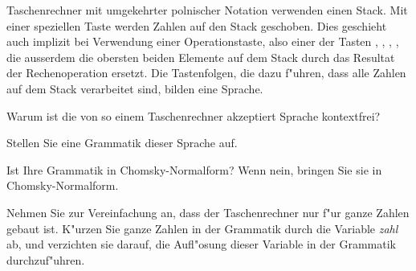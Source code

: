 Taschenrechner mit umgekehrter polnischer Notation verwenden einen Stack.
Mit einer speziellen Taste  werden Zahlen auf den Stack
geschoben. Dies geschieht auch implizit bei Verwendung einer
Operationstaste, also einer der Tasten \keys{{$+$}}, \keys{{$-$}},
\keys{{$\times$}}, \keys{{$\div$}}, die ausserdem die obersten
beiden Elemente auf dem Stack durch das Resultat der Rechenoperation 
ersetzt. Die Tastenfolgen, die dazu f"uhren, dass alle Zahlen auf dem 
Stack verarbeitet sind, bilden eine Sprache.

\begin{teilaufgaben}
\item Warum ist die von so einem Taschenrechner akzeptiert Sprache
kontextfrei?
\item Stellen Sie eine Grammatik dieser Sprache auf.
\item Ist Ihre Grammatik in Chomsky-Normalform? Wenn nein, bringen Sie sie
in Chomsky-Normalform.
\end{teilaufgaben}

\begin{hinweis}
Nehmen Sie zur Vereinfachung an, dass der Taschenrechner nur f"ur ganze
Zahlen gebaut ist. K"urzen Sie ganze Zahlen in der Grammatik durch
die Variable \textsl{zahl} ab, und verzichten sie darauf, die Aufl"osung
dieser Variable in der Grammatik durchzuf"uhren.
\end{hinweis}

